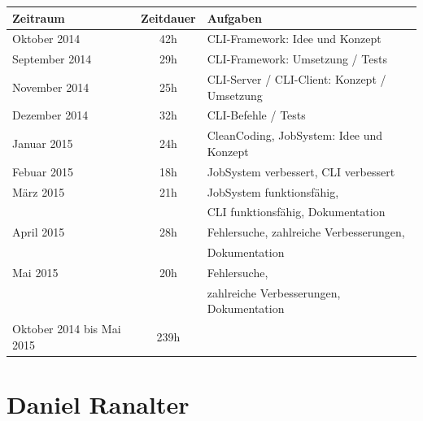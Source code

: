 \documentclass[12pt,a4paper]{report}
\begin{document}
\begin{onehalfspace}
\begin{center}
\begin{tabular}{|l|c|l|}
\hline
\textbf{Zeitraum} & \textbf{Zeitdauer} & \textbf{Aufgaben} \\ \hline
Oktober 2014 & 42h & CLI-Framework: Idee und Konzept\\
September 2014 & 29h & CLI-Framework: Umsetzung / Tests\\
November 2014 & 25h & CLI-Server / CLI-Client: Konzept / Umsetzung\\
Dezember 2014 & 32h & CLI-Befehle / Tests\\
Januar 2015 & 24h & CleanCoding, JobSystem: Idee und Konzept\\
Febuar 2015 & 18h & JobSystem verbessert, CLI verbessert\\
März 2015 & 21h & JobSystem funktionsfähig, \\&& CLI funktionsfähig, Dokumentation\\
April 2015 & 28h & Fehlersuche, zahlreiche Verbesserungen, \\&& Dokumentation \\
Mai 2015 & 20h & Fehlersuche,\\&& zahlreiche Verbesserungen, Dokumentation\\
\hline \hline
Oktober 2014 bis Mai 2015 & 239h &\\ \hline

\end{tabular}
\end{center}

\chapter{Daniel Ranalter}

\begin{tabular}{|l|c|l|}


\end{tabular}
\end{onehalfspace}
\end{document}
